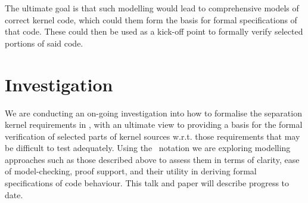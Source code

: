 The ultimate goal is that such modelling would lead to comprehensive models
of correct kernel code,
which could them form the basis for formal specifications of that code.
These could then be used as a kick-off point to formally verify selected
portions of said code.



\section{Investigation}

We are conducting an on-going investigation into how to formalise
the separation kernel requirements in \cite{IMAKQP-D02},
with an ultimate view to providing a basis for the formal verification
of selected parts of kernel sources w.r.t. those requirements that
may be difficult to test adequately.
Using the \Circus\ notation we are exploring modelling approaches
such as those described above
to assess them in terms of clarity, ease of model-checking, proof support,
and their utility in deriving formal specifications of code behaviour.
This talk and paper will describe progress to date.
